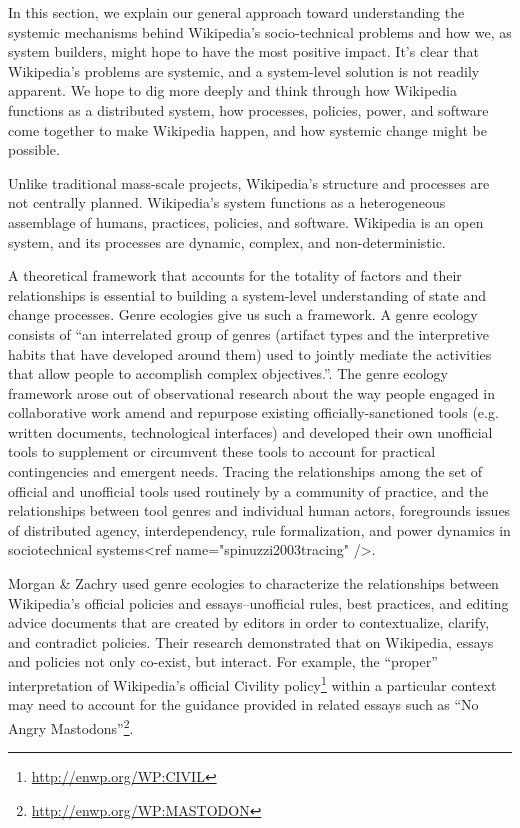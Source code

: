 In this section, we explain our general approach toward understanding the systemic mechanisms behind Wikipedia's socio-technical problems and how we, as system builders, might hope to have the most positive impact.  It's clear that Wikipedia's problems are systemic, and a system-level solution is not readily apparent. We hope to dig more deeply and think through how Wikipedia functions as a distributed system, how processes, policies, power, and software come together to make Wikipedia happen, and how systemic change might be possible.

  Unlike traditional mass-scale projects, Wikipedia's structure and processes are not centrally planned.  Wikipedia's system functions as a heterogeneous assemblage of humans, practices, policies, and software.  Wikipedia is an open system, and its processes are dynamic, complex, and non-deterministic.

A theoretical framework that accounts for the totality of factors and their relationships is essential to building a system-level understanding of state and change processes.  Genre ecologies give us such a framework. A genre ecology consists of ``an interrelated group of genres (artifact types and the interpretive habits that have developed around them) used to jointly mediate the activities that allow people to accomplish complex objectives.''\cite{spinuzzi2000genre}. The genre ecology framework arose out of observational research about the way people engaged in collaborative work amend and repurpose existing officially-sanctioned tools (e.g. written documents, technological interfaces) and developed their own unofficial tools to supplement or circumvent these tools to account for practical contingencies and emergent needs. Tracing the relationships among the set of official and unofficial tools used routinely by a community of practice, and the relationships between tool genres and individual human actors, foregrounds issues of distributed agency, interdependency, rule formalization, and power dynamics in sociotechnical systems<ref name="spinuzzi2003tracing" />.

Morgan \& Zachry used genre ecologies to characterize the relationships between Wikipedia's official policies and essays--unofficial rules, best practices, and editing advice documents that are created by editors in order to contextualize, clarify, and contradict policies\cite{morgan2010negotiating}. Their research demonstrated that on Wikipedia, essays and policies not only co-exist, but interact. For example, the ``proper'' interpretation of Wikipedia's official Civility policy\footnote{\url{http://enwp.org/WP:CIVIL}} within a particular context may need to account for the guidance provided in related essays such as ``No Angry Mastodons''\footnote{\url{http://enwp.org/WP:MASTODON}}.

